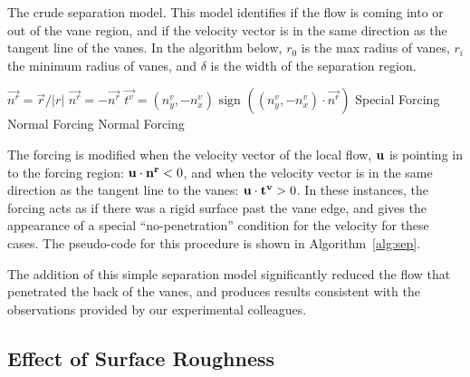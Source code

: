 %
%
\begin{center}
 \begin{algorithm}
  \caption{The crude separation model. This model identifies if the flow
  is coming into or out of the vane region, and if the velocity vector
  is in the same direction as the tangent line of the vanes. In the
  algorithm below, $r_0$ is the max radius of vanes, $r_i$ the minimum
  radius of vanes, and $\delta$ is the width of the separation region.}
  \label{alg:sep}
  \begin{algorithmic}[1]
   \State $\overrightarrow{n^r} = \overrightarrow{r}/|r|$
   \State $\overrightarrow{n^r} = -\overrightarrow{n^r}$
   \EndIf
   \State $\overrightarrow{t^v} = (n_y^v , -n_x^v) \text{ sign
   }((n_y^v,-n_x^v) \cdot \overrightarrow{n^r})$
   \State Special Forcing
   \Else
   \State Normal Forcing
   \EndIf
   \Else
   \State Normal Forcing
   \EndIf
   \EndIf
  \end{algorithmic}
 \end{algorithm}
\end{center}
%

The forcing is modified when the velocity vector of the local flow, $\bf
u$ is pointing in to the forcing region: ${\bf u} \cdot {\bf n^r} < 0$, and
when the velocity vector is in the same direction as the tangent line to
the vanes: ${\bf u} \cdot {\bf t^v} > 0 $. In these instances, the
forcing acts as if there was a rigid surface past the vane edge, and
gives the appearance of a special ``no-penetration'' condition for the
velocity for these cases. The pseudo-code for this procedure is shown in
Algorithm~\ref{alg:sep}.

The addition of this simple separation model significantly reduced the
flow that penetrated the back of the vanes, and produces results
consistent with the observations provided by our experimental
colleagues.  

\subsection{Effect of Surface Roughness}



